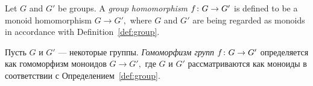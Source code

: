 \documentclass[../main/CT4S-EN-RU]{subfiles}
\begin{document}
\begin{definitionENG}\label{def:group homomorphism}
Let $G$ and $G'$ be groups. A {\em group homomorphism} $f\colon G\rightarrow G'$ is defined to be a monoid homomorphism $G\to G',$ where $G$ and $G'$ are being regarded as monoids in accordance with Definition~\ref{def:group}.
\end{definitionENG}

\begin{definitionRUS}\label{def:group homomorphism}
Пусть $G$ и $G'$ — некоторые группы. {\em Гомоморфизм групп} $f\colon G\rightarrow G'$ определяется как гомоморфизм моноидов $G\to G',$ где $G$ и $G'$ рассматриваются как моноиды в соответствии с Определением~\ref{def:group}.
\end{definitionRUS}
\end{document}
